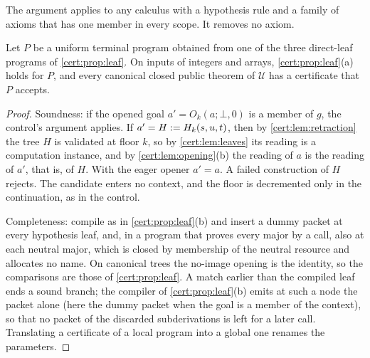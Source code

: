 The argument applies to any calculus with a hypothesis rule and a family of
axioms that has one member in every scope. It removes no axiom.

\begin{proposition}\label{cert:prop:terminal}
Let $P$ be a uniform terminal program obtained from one of the three
direct-leaf programs of \cref{cert:prop:leaf}. On inputs of integers and
arrays, \cref{cert:prop:leaf}(a) holds for $P$, and every canonical closed
public theorem of $\mathcal U$ has a certificate that $P$ accepts.
\end{proposition}
\begin{proof}
Soundness: if the opened goal $a'=O_k(a;\bot,0)$ is a member of $g$, the
control's argument applies. If $a'=H\mathrel{:=} H_k(s,u,t)$, then by
\cref{cert:lem:retraction} the tree $H$ is validated at floor $k$, so by
\cref{cert:lem:leaves} its reading is a computation instance, and by
\cref{cert:lem:opening}(b) the reading of $a$ is the reading of $a'$, that is,
of $H$. With the eager opener $a'=a$. A failed construction of $H$ rejects. The
candidate enters no context, and the floor is decremented only in the
continuation, as in the control.

Completeness: compile as in \cref{cert:prop:leaf}(b) and insert a dummy packet
at every hypothesis leaf, and, in a program that proves every major by a call,
also at each neutral major, which is closed by membership of the neutral
resource and allocates no name. On canonical trees the no-image opening is the
identity, so the comparisons are those of \cref{cert:prop:leaf}. A match
earlier than the compiled leaf ends a sound branch; the compiler of
\cref{cert:prop:leaf}(b) emits at such a node the packet alone (here the dummy
packet when the goal is a member of the context), so that no packet of the
discarded subderivations is left for a later call.
Translating a certificate of a local program into a global one renames the
parameters.
\end{proof}

